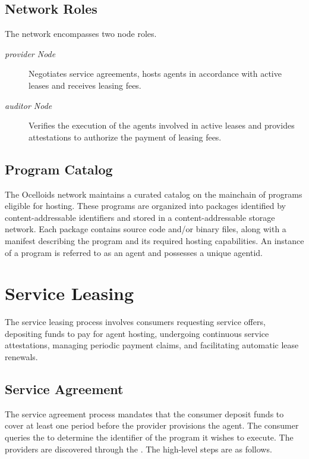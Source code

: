 \documentclass{oc}
\begin{document}
\subsection{Network Roles}\label{sec:network-roles}

The network encompasses two node roles.
\begin{description}
  \item[\emph{\Gls*{provider} Node}] Negotiates service agreements, hosts \glspl{agent} in accordance with active leases and receives leasing fees.
  \item[\emph{\Gls*{auditor} Node}] Verifies the execution of the \glspl{agent} involved in active leases and provides attestations to authorize the payment of leasing fees.
\end{description}

\subsection{Program Catalog}\label{sec:programs}

The Ocelloids network maintains a curated catalog on the \gls{mainchain} of programs eligible for hosting.
These programs are organized into packages identified by content-addressable identifiers and stored in a content-addressable storage network. 
Each package contains source code and/or binary files, along with a manifest describing the program and its required hosting capabilities.
An instance of a program is referred to as an \gls{agent} and possesses a unique \gls{agentid}.


\section{Service Leasing}\label{sec:leasing}

The service leasing process involves consumers requesting service offers, depositing funds to pay for \gls{agent} hosting, undergoing continuous service attestations, managing periodic payment claims, and facilitating automatic lease renewals.

\subsection{Service Agreement}\label{sec:service-agreement}

The service agreement process mandates that the \gls{consumer} deposit funds to cover at least one period before the \gls{provider} provisions the \gls{agent}.
The \gls{consumer} queries the  to determine the identifier of the program it wishes to execute.
The \glspl{provider} are discovered through the .
The high-level steps are as follows.
\end{document}
